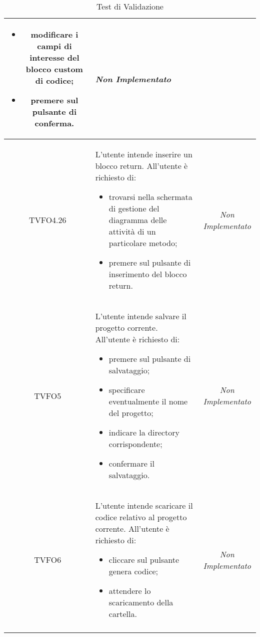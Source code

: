 \begin{longtable}{|c|>{}m{8cm}|c|}
\begin{itemize}
\item modificare i campi di interesse del blocco custom di codice;
\item premere sul pulsante di conferma.
\end{itemize} & \textit{Non Implementato}\\ \hline
\hypertarget{TVFO4.26}{TVFO4.26} & L'utente intende inserire un blocco return.
All'utente è richiesto di:
\begin{itemize}
\item trovarsi nella schermata di gestione del diagramma delle attività di un particolare metodo;
\item premere sul pulsante di inserimento del blocco return.
\end{itemize} & \textit{Non Implementato}\\ \hline
\hypertarget{TVFO5}{TVFO5} & L'utente intende salvare il progetto corrente.
All'utente è richiesto di:
\begin{itemize}
\item premere sul pulsante di salvataggio;
\item specificare eventualmente il nome del progetto;
\item indicare la directory corrispondente;
\item confermare il salvataggio.
\end{itemize} & \textit{Non Implementato}\\ \hline
\hypertarget{TVFO6}{TVFO6} & L'utente intende scaricare il codice relativo al progetto corrente.
All'utente è richiesto di:
\begin{itemize}
\item cliccare sul pulsante genera codice;
\item attendere lo scaricamento della cartella.
\end{itemize} & \textit{Non Implementato}\\ \hline
\caption[Test di Validazione]{Test di Validazione}
\label{tabella:test0}
\end{longtable}

